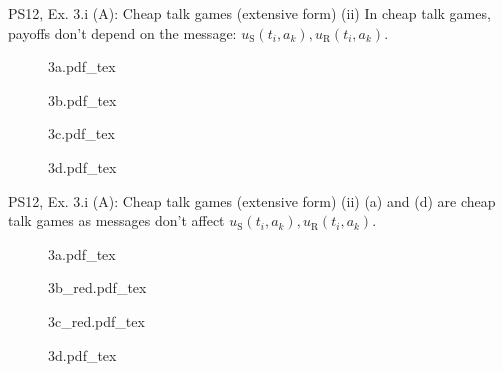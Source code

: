 \begin{frame}{PS12, Ex. 3.i (A): Cheap talk games (extensive form)}
    (ii) In cheap talk games, payoffs don't depend on the message: $u_\text{S}(t_i,a_k),u_\text{R}(t_i,a_k)$.\vspace{-6pt}
    \begin{multicols}{2}
      \begin{figure}[!h]
        \center{}
        {3a.pdf_tex}
      \end{figure}\vspace{-6pt}
      \begin{figure}[!h]
        \center{}
        {3b.pdf_tex}
      \end{figure}
      \vfill\null\columnbreak
      \begin{figure}[!h]
        \center{}
        {3c.pdf_tex}
      \end{figure}\vspace{-6pt}
      \begin{figure}[!h]
        \center{}
        {3d.pdf_tex}
      \end{figure}
      \vfill\null
    \end{multicols}
\end{frame}
\begin{frame}{PS12, Ex. 3.i (A): Cheap talk games (extensive form)}
    (ii) (a) and (d) are cheap talk games as messages don't affect $u_\text{S}(t_i,a_k),u_\text{R}(t_i,a_k)$.\vspace{-14pt}
    \begin{multicols}{2}
      \vfill\null\vspace{-12.5pt}
      \begin{figure}[!h]
        \center{}
        {3a.pdf_tex}
      \end{figure}\vspace{-19pt}
      \begin{figure}[!h]
        \center{}
        {3b_red.pdf_tex}
      \end{figure}
      \vfill\null\columnbreak
      \begin{figure}[!h]
        \center{}
        {3c_red.pdf_tex}
      \end{figure}\vspace{-8pt}
      \begin{figure}[!h]
        \center{}
        {3d.pdf_tex}
      \end{figure}
      \vfill\null
    \end{multicols}
\end{frame}


